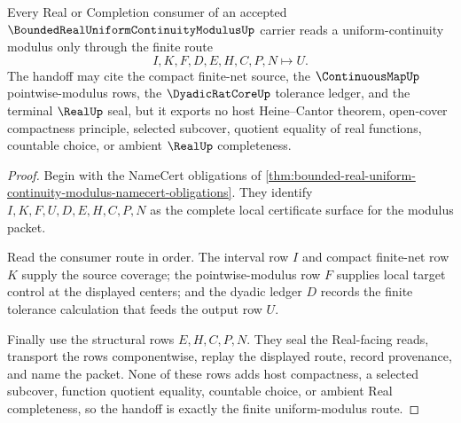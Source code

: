 \begin{theorem}
\label{thm:bounded-real-uniform-continuity-modulus-consumer-handoff}
Every Real or Completion consumer of an accepted $\BoundedRealUniformContinuityModulusUp$ carrier reads a uniform-continuity modulus only through the finite route
$$
I,K,F,D,E,H,C,P,N \longmapsto U.
$$
The handoff may cite the compact finite-net source, the $\ContinuousMapUp$ pointwise-modulus rows, the $\DyadicRatCoreUp$ tolerance ledger, and the terminal $\RealUp$ seal, but it exports no host Heine--Cantor theorem, open-cover compactness principle, selected subcover, quotient equality of real functions, countable choice, or ambient $\RealUp$ completeness.
\end{theorem}
\begin{proof}
Begin with the NameCert obligations of \autoref{thm:bounded-real-uniform-continuity-modulus-namecert-obligations}. They identify $I,K,F,U,D,E,H,C,P,N$ as the complete local certificate surface for the modulus packet.

Read the consumer route in order. The interval row $I$ and compact finite-net row $K$ supply the source coverage; the pointwise-modulus row $F$ supplies local target control at the displayed centers; and the dyadic ledger $D$ records the finite tolerance calculation that feeds the output row $U$.

Finally use the structural rows $E,H,C,P,N$. They seal the Real-facing reads, transport the rows componentwise, replay the displayed route, record provenance, and name the packet. None of these rows adds host compactness, a selected subcover, function quotient equality, countable choice, or ambient Real completeness, so the handoff is exactly the finite uniform-modulus route.
\end{proof}



